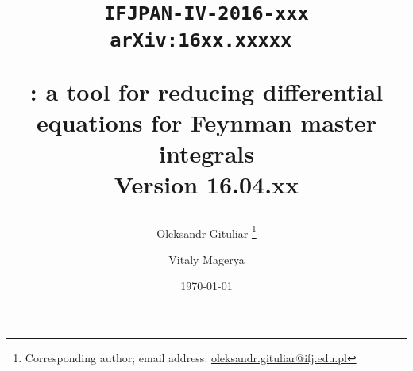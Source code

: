 \title{
  \begin{flushright}
  \tt\normalsize{IFJPAN-IV-2016-xxx}\\ 
  \tt\normalsize{arXiv:16xx.xxxxx} 
  \end{flushright}
  \vspace{1cm}
  \Large \bf \fuchsia: a tool for reducing differential equations for Feynman master integrals\\
  \vspace{0.5cm}
  \normalsize \bf Version 16.04.xx
}

\author[a]{Oleksandr Gituliar%
    \thanks{Corresponding author; email address:
        \href{mailto:oleksandr.gituliar@ifj.edu.pl}
            {oleksandr.gituliar@ifj.edu.pl}}}

\author[ ]{Vitaly Magerya}


\date{\today}
